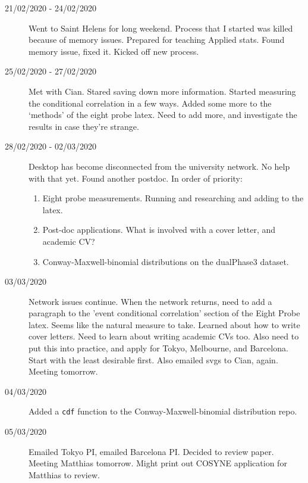 \documentclass[a4paper,12pt]{article}
\theoremstyle{definition}
\begin{document}
\begin{description}
                                \item[21/02/2020 - 24/02/2020] Went to Saint Helens for long weekend. Process that I started was killed because of memory issues. Prepared for teaching Applied stats. Found memory issue, fixed it. Kicked off new process.

                                \item[25/02/2020 - 27/02/2020] Met with Cian. Stared saving down more information. Started measuring the conditional correlation in a few ways. Added some more to the `methods' of the eight probe latex. Need to add more, and investigate the results in case they're strange.

                                \item[28/02/2020 - 02/03/2020] Desktop has become disconnected from the university network. No help with that yet. Found another postdoc. In order of priority:
                                  \begin{enumerate}
                                      \item Eight probe measurements. Running and researching and adding to the latex.
                                      \item Post-doc applications. What is involved with a cover letter, and academic CV?
                                      \item Conway-Maxwell-binomial distributions on the dualPhase3 dataset.
                                  \end{enumerate}

                                \item[03/03/2020] Network issues continue. When the network returns, need to add a paragraph to the 'event conditional correlation' section of the Eight Probe latex. Seems like the natural measure to take. Learned about how to write cover letters. Need to learn about writing academic CVs too. Also need to put this into practice, and apply for Tokyo, Melbourne, and Barcelona. Start with the least desirable first. Also emailed svgs to Cian, again. Meeting tomorrow.

                                \item[04/03/2020] Added a \texttt{cdf} function to the Conway-Maxwell-binomial distribution repo.

                                \item[05/03/2020] Emailed Tokyo PI, emailed Barcelona PI. Decided to review paper. Meeting Matthias tomorrow. Might print out COSYNE application for Matthias to review.


\end{description}
\end{document}
